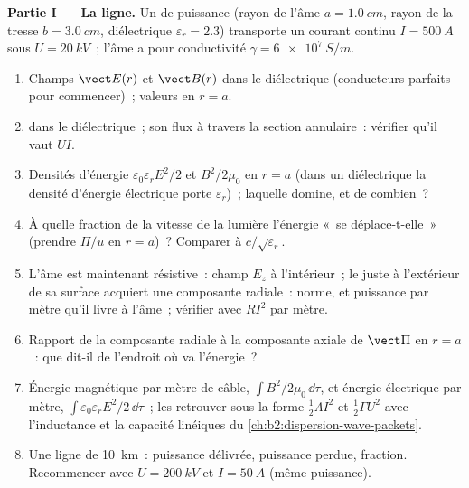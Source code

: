\begin{problem}
\label{pb:b2:poynting-vector:1}

\medskip
\noindent\textbf{Partie I --- La ligne.}
Un  de puissance (rayon de l'âme $a = \qty{1.0}{cm}$, rayon de la tresse $b =
\qty{3.0}{cm}$, diélectrique $\varepsilon_r = 2.3$) transporte un courant continu $I =
\qty{500}{A}$ sous $U = \qty{20}{kV}$~; l'âme a pour conductivité $\gamma =
\qty{6e7}{S/m}$.
\begin{enumerate}
  \item Champs $\vect E(r)$ et $\vect B(r)$ dans le diélectrique (conducteurs
        parfaits pour commencer)~; valeurs en $r = a$.
  \item {} dans le diélectrique~; son flux à travers la
        section annulaire~: vérifier qu'il vaut $UI$.
  \item Densités d'énergie $\varepsilon_0\varepsilon_rE^2/2$ et $B^2/2\mu_0$ en $r = a$
        (dans un diélectrique la densité d'énergie électrique porte $\varepsilon_r$)~;
        laquelle domine, et de combien~?
  \item À quelle fraction de la vitesse de la lumière l'énergie «~se déplace-t-elle~»
        (prendre $\Pi/u$ en $r = a$)~? Comparer à $c/\sqrt{\varepsilon_r}$.
  \item L'âme est maintenant résistive~: champ $E_z$ à l'intérieur~; le
         juste à l'extérieur de sa surface acquiert une composante
        radiale~: norme, et puissance par mètre qu'il livre à
        l'âme~; vérifier avec $RI^2$ par mètre.
  \item Rapport de la composante radiale à la composante axiale de $\vect\Pi$ en $r =
        a$~: que dit-il de l'endroit où va l'énergie~?
  \item Énergie magnétique par mètre de câble, $\int B^2/2\mu_0\,\dd\tau$, et
        énergie électrique par mètre, $\int\varepsilon_0\varepsilon_rE^2/2\,\dd\tau$~;
        les retrouver sous la forme $\tfrac12\Lambda I^2$ et $\tfrac12\Gamma U^2$ avec
        l'inductance et la capacité linéiques du \cref{ch:b2:dispersion-wave-packets}.
  \item Une ligne de \qty{10}{km}~: puissance délivrée, puissance perdue, fraction.
        Recommencer avec $U = \qty{200}{kV}$ et $I = \qty{50}{A}$ (même puissance).
\end{enumerate}


\end{problem}
